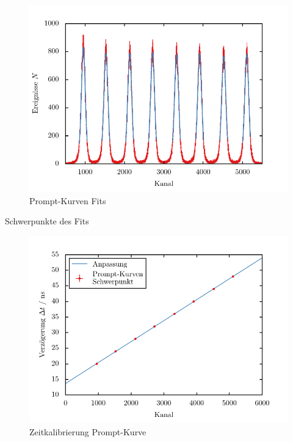 \documentclass[11pt, a4paper]{article}
\numberwithin{equation}{section}
\begin{document}
\begin{figure}[h]
	\centering
	\includegraphics{./figures/prompt_curve_fits.pdf}
	\caption{Prompt-Kurven Fits}
\end{figure}

\begin{table}[h]
	\centering
	
	\caption{Schwerpunkte des Fits}
\end{table}

\begin{figure}[h]
	\centering
	\includegraphics{./figures/prompt_curve.pdf}
	\caption{Zeitkalibrierung Prompt-Kurve}
\end{figure}
\end{document}
